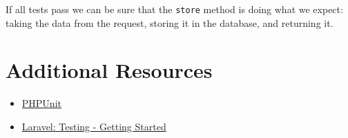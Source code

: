 If all tests pass we can be sure that the \texttt{store} method is doing what we expect: taking the data from the request, storing it in the database, and returning it.



\section{Additional Resources}

\begin{itemize}[leftmargin=*]
    \item \href{https://github.com/sebastianbergmann/phpunit}{PHPUnit}
    \item \href{http://laravel.com/docs/6.x/testing}{Laravel: Testing - Getting Started}
\end{itemize}
